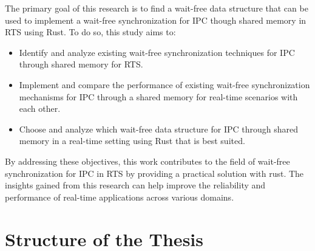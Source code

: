 The primary goal of this research is to find a wait-free data structure that can be used to implement a wait-free synchronization for \ac{IPC} though shared memory in \ac{RTS} using Rust. To do so, this study aims to:

\begin{itemize}
\item Identify and analyze existing wait-free synchronization techniques for \ac{IPC} through shared memory for \ac{RTS}.
\item Implement and compare the performance of existing wait-free synchronization mechanisms for \ac{IPC} through a shared memory for real-time scenarios with each other.
\item Choose and analyze which wait-free data structure for \ac{IPC} through shared memory in a real-time setting using Rust that is best suited.
\end{itemize}

By addressing these objectives, this work contributes to the field of wait-free synchronization for \ac{IPC} in \ac{RTS} by providing a practical solution with rust. The insights gained from this research can help improve the reliability and performance of real-time applications across various domains.

\section{Structure of the Thesis}\label{sec:structure-of-the-thesis}


